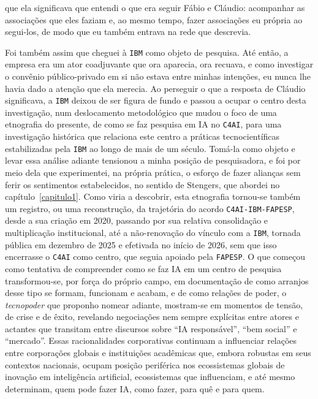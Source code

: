 que ela significava que entendi o que era seguir Fábio e Cláudio: acompanhar as associações que eles faziam e, ao mesmo tempo, fazer associações eu própria ao segui-los, de modo que eu também entrava na rede que descrevia.

Foi também assim que cheguei à \texttt{IBM} como objeto de pesquisa. Até então, a empresa era um ator coadjuvante que ora aparecia, ora recuava, e como investigar o convênio público-privado em si não estava entre minhas intenções, eu nunca lhe havia dado a atenção que ela merecia. Ao perseguir o que a resposta de Cláudio significava, a \texttt{IBM} deixou de ser figura de fundo e passou a ocupar o centro desta investigação, num deslocamento metodológico que mudou o foco de uma etnografia do presente, de como se faz pesquisa em IA no \texttt{C4AI}, para uma investigação histórica que relaciona este centro a práticas tecnocientíficas estabilizadas pela \texttt{IBM} ao longo de mais de um século. Tomá-la como objeto e levar essa análise adiante tensionou a minha posição de pesquisadora, e foi por meio dela que experimentei, na própria prática, o esforço de fazer alianças sem ferir os sentimentos estabelecidos, no sentido de Stengers, que abordei no capítulo~\ref{capitulo1}. Como viria a descobrir, esta etnografia tornou-se também um registro, ou uma reconstrução, da trajetória do acordo \texttt{C4AI-IBM-FAPESP}, desde a sua criação em 2020, passando por sua relativa consolidação e multiplicação institucional, até a não-renovação do vínculo com a \texttt{IBM}, tornada pública em dezembro de 2025 e efetivada no início de 2026, sem que isso encerrasse o \texttt{C4AI} como centro, que seguia apoiado pela \texttt{FAPESP}. O que começou como tentativa de compreender como se faz IA em um centro de pesquisa transformou-se, por força do próprio campo, em documentação de como arranjos desse tipo se formam, funcionam e acabam, e de como relações de poder, o \textit{tecnopoder} que proponho nomear adiante, mostram-se em momentos de tensão, de crise e de êxito, revelando negociações nem sempre explícitas entre atores e actantes que transitam entre discursos sobre \enquote{IA responsável}, \enquote{bem social} e \enquote{mercado}. Essas racionalidades corporativas continuam a influenciar relações entre corporações globais e instituições acadêmicas que, embora robustas em seus contextos nacionais, ocupam posição periférica nos ecossistemas globais de inovação em inteligência artificial, ecossistemas que influenciam, e até mesmo determinam, quem pode fazer IA, como fazer, para quê e para quem.


